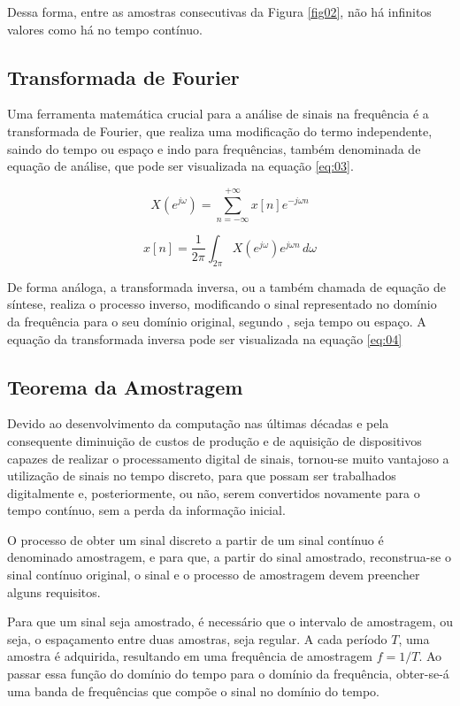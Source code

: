 Dessa forma, entre as amostras consecutivas da Figura \ref{fig02}, não há infinitos valores como há no tempo contínuo.

\subsection{Transformada de Fourier}
Uma ferramenta matemática crucial para a análise de sinais na frequência é a transformada de Fourier, que realiza uma modificação do termo independente, saindo do tempo ou espaço e indo para frequências, também denominada de equação de análise, que pode ser visualizada na equação \ref{eq:03}.

\begin{equation}  \label{eq:03}
X(e^{j\omega})= \sum_{n=-\infty}^{+\infty} x[n]e^{-j\omega n}
\end{equation}

\begin{equation}  \label{eq:04}
x[n]=\frac{1}{2\pi} \int_{2\pi}^{} X(e^{j\omega})e^{j\omega n} \,d\omega
\end{equation}

De forma análoga, a transformada inversa, ou a também chamada de equação de síntese, realiza o processo inverso, modificando o sinal representado no domínio da frequência para o seu domínio original, segundo \cite{oppenheim2010sinais}, seja tempo ou espaço. A equação da transformada inversa pode ser visualizada na equação \ref{eq:04}

\subsection{Teorema da Amostragem}
Devido ao desenvolvimento da computação nas últimas décadas e pela consequente diminuição de custos de produção e de aquisição de dispositivos capazes de realizar o processamento digital de sinais, tornou-se muito vantajoso a utilização de sinais no tempo discreto, para que possam ser trabalhados digitalmente e, posteriormente, ou não, serem convertidos novamente para o tempo contínuo, sem a perda da informação inicial. 

O processo de obter um sinal discreto a partir de um sinal contínuo é denominado amostragem, e para que, a partir do sinal amostrado, reconstrua-se o sinal contínuo original, o sinal e o processo de amostragem devem preencher alguns requisitos.

Para que um sinal seja amostrado, é necessário que o intervalo de amostragem, ou seja, o espaçamento entre duas amostras, seja regular. A cada período $T$, uma amostra é adquirida, resultando em uma frequência de amostragem $f = 1/T$. Ao passar essa função do domínio do tempo para o domínio da frequência, obter-se-á uma banda de frequências que compõe o sinal no domínio do tempo.

